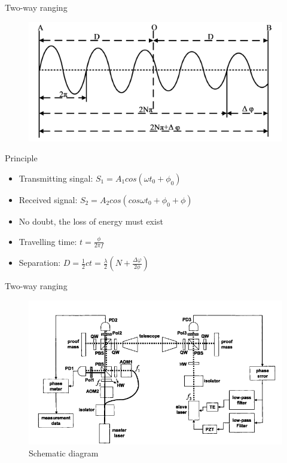 \documentclass{beamer}
\begin{document}
\begin{frame}[fragile]{Two-way ranging}
    \begin{figure}
        \includegraphics[width=0.5\linewidth]{images/two-way-ranging.png}
    \end{figure}
    
    \begin{block}{Principle}
        \begin{itemize}
            \item Transmitting singal: $S_1 = A_1 cos(\omega t_0 + \phi_0)$
            \item Received signal: $S_2 = A_2cos(cos\omega t_0 + \phi_0 + \phi)$
            \item No doubt, the loss of energy must exist
            \item Travelling time: $t = \frac{\phi}{2 \pi f}$
            \item Separation: $D = \frac{1}{2}ct = \frac{\lambda}{2}(N+\frac{\Delta \varphi}{2\phi})$
        \end{itemize}
    \end{block}
\end{frame}

\begin{frame}[fragile]{Two-way ranging}
    \begin{figure}
        \includegraphics[width=0.8\linewidth]{images/liang.png}
        \caption{Schematic diagram}
    \end{figure}
\end{frame}
\end{document}
